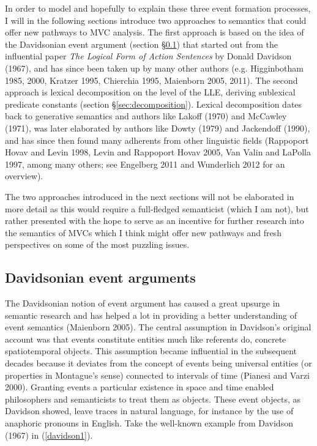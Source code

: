 In order to model and hopefully to explain these three event formation processes, I will in the following sections introduce two approaches to semantics that could offer new pathways to MVC analysis. The first approach is based on the idea of the Davidsonian event argument (section §\ref{sec:davidsonian}) that started out from the influential paper \textit{The Logical Form of Action Sentences} by Donald Davidson (1967), and has since been taken up by many other authors (e.g. Higginbotham 1985, 2000, Kratzer 1995, Chierchia 1995, Maienborn 2005, 2011). The second approach is lexical decomposition on the level of the LLE, deriving sublexical predicate constants (section §\ref{sec:decomposition}). Lexical decomposition dates back to generative semantics and authors like Lakoff (1970) and McCawley (1971), was later elaborated by authors like Dowty (1979) and Jackendoff (1990), and has since then found many adherents from other linguistic fields (Rappoport Hovav and Levin 1998, Levin and Rappoport Hovav 2005, Van Valin and LaPolla 1997, among many others; see Engelberg 2011 and Wunderlich 2012 for an overview).

The two approaches introduced in the next sections will not be elaborated in more detail as this would require a full-fledged semanticist (which I am not), but rather presented with the hope to serve as an incentive for further research into the semantics of MVCs which I think might offer new pathways and fresh perspectives on some of the most puzzling issues.

\subsection{Davidsonian event arguments} \label{sec:davidsonian}

The Davidsonian notion of event argument has caused a great upsurge in semantic research and has helped a lot in providing a better understanding of event semantics (Maienborn 2005). The central assumption in Davidson's original account was that events constitute entities much like referents do, concrete spatiotemporal objects. This assumption became influential in the subsequent decades because it deviates from the concept of events being universal entities (or properties in Montague's sense) connected to intervals of time (Pianesi and Varzi 2000). Granting events a particular existence in space and time enabled philosophers and semanticists to treat them as objects. These event objects, as Davidson showed, leave traces in natural language, for instance by the use of anaphoric pronouns in English. Take the well-known example from Davidson (1967) in (\ref{davidson1}).

